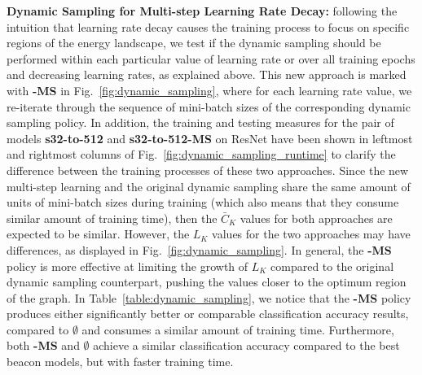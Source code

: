 \documentclass[10pt,journal,compsoc]{IEEEtran}
\begin{document}




\textbf{Dynamic Sampling for Multi-step Learning Rate Decay:}
following the intuition that learning rate decay causes the training process to focus on specific regions of the  energy landscape, we test if the dynamic sampling should be performed within each particular value of learning rate or over all training epochs and decreasing learning rates, as explained above.  This new approach is marked with {\bf -MS} in Fig.~\ref{fig:dynamic_sampling}, where for each learning rate value, we re-iterate through the sequence of mini-batch sizes of the corresponding dynamic sampling policy.
In addition, the training and testing measures for the pair of models {\bf s32-to-512} and {\bf s32-to-512-MS} on ResNet have been shown in leftmost and rightmost columns of Fig.~\ref{fig:dynamic_sampling_runtime} to clarify the difference between the training processes of these two approaches.  Since the new multi-step learning and the original dynamic sampling share the same amount of units of mini-batch sizes during training (which also means that they consume similar amount of training time), then the $\bar{C}_K$ values for both approaches are expected to be similar.  However, the $L_K$ values for the two approaches may have differences, as displayed in Fig.~\ref{fig:dynamic_sampling}.  In general, the {\bf -MS} policy is more effective at limiting the growth of $L_K$ compared to the original dynamic sampling counterpart, pushing the values closer to the optimum region of the graph.
In Table~\ref{table:dynamic_sampling}, we notice that the {\bf -MS} policy produces either significantly better or comparable classification accuracy results, compared to {\bf $\emptyset$} and consumes a similar amount of training time.  Furthermore, both {\bf -MS} and {\bf $\emptyset$} achieve a similar classification accuracy compared to the best beacon models, but with faster training time.
\end{document}
